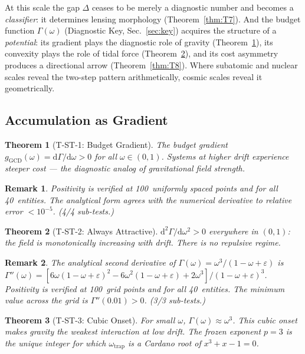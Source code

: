 \documentclass[
  aps,
  prd,
  twocolumn,
  superscriptaddress,
  nofootinbib,
  floatfix
]{revtex4-2}
\newtheorem{theorem}{Theorem}
\newtheorem{remark}{Remark}
\newcommand{\Gam}{\Gamma}
\newcommand{\eps}{\varepsilon}
\newcommand{\dd}{\mathrm{d}}
\begin{document}
At this scale the gap $\Delta$ ceases to be merely a
diagnostic number and becomes a \emph{classifier}: it
determines lensing morphology (Theorem~\ref{thm:T7}).  And
the budget function $\Gam(\omega)$ (Diagnostic Key,
Sec.~\ref{sec:key}) acquires the structure of a
\emph{potential}: its gradient plays the diagnostic role of
gravity (Theorem~\ref{thm:T1}), its convexity plays the
role of tidal force (Theorem~\ref{thm:T2}), and its cost
asymmetry produces a directional arrow
(Theorem~\ref{thm:T8}).  Where subatomic and nuclear scales
reveal the two-step pattern arithmetically, cosmic scales
reveal it geometrically.

\subsection{Accumulation as Gradient}

\begin{theorem}[T-ST-1: Budget Gradient]\label{thm:T1}
The budget gradient
$g_{\mathrm{GCD}}(\omega) = \dd\Gam/\dd\omega > 0$
for all $\omega \in (0,1)$.  Systems at higher drift
experience steeper cost --- the diagnostic analog of
gravitational field strength.
\end{theorem}

\begin{remark}
Positivity is verified at 100~uniformly spaced points and
for all 40~entities.  The analytical form agrees with the
numerical derivative to relative error $< 10^{-5}$.
(4/4 sub-tests.)
\end{remark}

\begin{theorem}[T-ST-2: Always Attractive]\label{thm:T2}
$\dd^2\Gam/\dd\omega^2 > 0$ everywhere in $(0,1)$: the field
is monotonically increasing with drift.  There is no
repulsive regime.
\end{theorem}

\begin{remark}
The analytical second derivative of
$\Gam(\omega) = \omega^3/(1 - \omega + \eps)$ is
$\Gam''(\omega) = [6\omega(1{-}\omega{+}\eps)^2 -
6\omega^2(1{-}\omega{+}\eps) + 2\omega^3] /
(1{-}\omega{+}\eps)^3$.  Positivity is verified at
100~grid points and for all 40~entities.  The minimum
value across the grid is $\Gam''(0.01) > 0$.
(3/3 sub-tests.)
\end{remark}

\begin{theorem}[T-ST-3: Cubic Onset]\label{thm:T3}
For small $\omega$, $\Gam(\omega) \approx \omega^3$.  This
cubic onset makes gravity the weakest interaction at low drift.
The frozen exponent $p = 3$ is the unique integer for which
$\omega_{\mathrm{trap}}$ is a Cardano root of
$x^3 + x - 1 = 0$.
\end{theorem}
\end{document}
